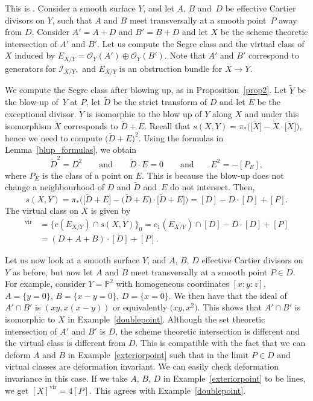 \documentclass[pdftex]{sigma}
\numberwithin{equation}{section}
\newcommand{\vv}{\mathrm{vir}}
\newcommand{\PP}{\mathbb P}
\begin{document}
\begin{Example}\label{exteriorpoint}
This is \cite[Example 4.2.2]{Fulton}. Consider a smooth surface $Y$, and let $A$, $B$ and~$D$ be effective Cartier divisors on $Y$, such that $A$ and $B$ meet transversally at a smooth point~$P$ away from $D$. Consider $A'=A+D$ and $B'=B+D$ and let $X$ be the scheme theoretic intersection of $A'$ and $B'$. Let us compute the Segre class and the virtual class of~$X$ induced by $E_{X/Y}=\mathcal O_Y(A')\oplus\mathcal O_Y(B')$. Note that $A'$ and $B'$ correspond to generators for $\mathcal{I}_{X/Y},$ and $E_{X/Y}$ is an obstruction bundle for $X\to Y$.

We compute the Segre class after blowing up, as in Proposition~\ref{prop2}. Let $\tilde Y$ be the blow-up of~$Y$ at $P$, let $\tilde D$ be the strict transform of $D$ and let $E$ be the exceptional divisor. $\tilde Y$ is isomorphic to the blow up of $Y$ along $X$ and under this isomorphism $\tilde X$ corresponds to $\tilde D+E$. Recall that $s(X,Y)=\pi_*\big(\big[\tilde X\big]-\tilde X\cdot\big[\tilde X\big]\big)$, hence we need to compute $\big(\tilde D+E\big)^2$. Using the formulas in Lemma~\ref{blup_formulas}, we obtain
\begin{equation*}
 \tilde D^2=D^2 \qquad\text{and} \qquad \tilde D\cdot E=0 \qquad\text{and}\qquad E^2=-[P_E],
\end{equation*}
where $P_E$ is the class of a point on $E$. This is because the blow-up does not change a neighbourhood of $D$ and $\tilde D$ and~$E$ do not intersect. Then,
\[
 s(X,Y)=\pi_*\big(\big[\tilde D+E\big]-\big(\tilde D+E\big)\cdot\big[\tilde D+E\big]\big)=[D]-D\cdot[D]+[P].
\]
The virtual class on $X$ is given by
\begin{align*}
 [X]^\text{vir}&=\{c(E_{X/Y})\cap s(X,Y)\}_0 =c_1(E_{X/Y})\cap[D]-D\cdot[D]+[P]
 \\&=(D+A+B)\cdot[D]+[P].
\end{align*}
\end{Example}
\begin{Example}Let us now look at a smooth surface $Y$, and $A$, $B$, $D$ effective Cartier divisors on $Y$ as before, but now let $A$ and $B$ meet transversally at a smooth point $P\in D$. For example, consider $Y=\PP^2$ with homogeneous coordinates $[x:y:z]$, $A=\{y=0\}$, $B=\{x-y=0\}$, $D=\{x=0\}$. We then have that the ideal of $A'\cap B'$ is $(xy, x(x-y))$ or equivalently $\big(xy, x^2\big)$. This shows that $A'\cap B'$ is isomorphic to $X$ in Example~\ref{doublepoint}. Although the set theoretic intersection of $A'$ and $B'$ is $D$, the scheme theoretic intersection is different and the virtual class is different from $D$. This is compatible with the fact that we can deform $A$ and $B$ in Example~\ref{exteriorpoint} such that in the limit $P\in D$ and virtual classes are deformation invariant. We can easily check deformation invariance in this case. If we take $A$, $B$, $D$ in Example~\ref{exteriorpoint} to be lines, we get $[X]^{\vv}= 4[P]$. This agrees with Example~\ref{doublepoint}.
\end{Example}
\end{document}
